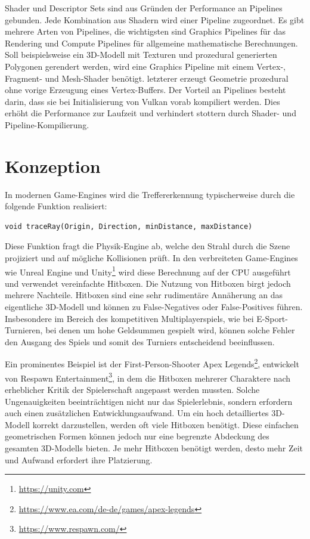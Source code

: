 \documentclass[11pt]{scrartcl}
\begin{document}
{	Shader und Descriptor Sets sind aus Gründen der Performance an Pipelines gebunden. Jede Kombination aus Shadern wird einer Pipeline zugeordnet. Es gibt mehrere Arten von Pipelines, die wichtigsten sind Graphics Pipelines für das Rendering und Compute Pipelines für allgemeine mathematische Berechnungen. Soll beispielsweise ein 3D-Modell mit Texturen und prozedural generierten Polygonen gerendert werden, wird eine Graphics Pipeline mit einem Vertex-, Fragment- und Mesh-Shader benötigt. letzterer erzeugt Geometrie prozedural ohne vorige Erzeugung eines Vertex-Buffers. Der Vorteil an Pipelines besteht darin, dass sie bei Initialisierung von Vulkan vorab kompiliert werden. Dies erhöht die Performance zur Laufzeit und verhindert stottern durch Shader- und Pipeline-Kompilierung.\cite{Sellers2017, VulkanPipelines}

	\pagebreak
	\section{Konzeption}
	
	In modernen Game-Engines wird die Treffererkennung typischerweise durch die folgende Funktion realisiert:
	\begin{lstlisting}[caption={\textit{traceRay} Funktion in Pseudocode},label={lst:listing-traceraypseudo}]
	void traceRay(Origin, Direction, minDistance, maxDistance)	\end{lstlisting}
	Diese Funktion fragt die Physik-Engine ab, welche den Strahl durch die Szene projiziert und auf mögliche Kollisionen prüft. In den verbreiteten Game-Engines wie Unreal Engine und Unity\footnote{\url{https://unity.com}} wird diese Berechnung auf der CPU ausgeführt und verwendet vereinfachte Hitboxen. Die Nutzung von Hitboxen birgt jedoch mehrere Nachteile. Hitboxen sind eine sehr rudimentäre Annäherung an das eigentliche 3D-Modell und können zu False-Negatives oder False-Positives führen. Insbesondere im Bereich des kompetitiven Multiplayerspiels, wie bei E-Sport-Turnieren, bei denen um hohe Geldsummen gespielt wird, können solche Fehler den Ausgang des Spiels und somit des Turniers entscheidend beeinflussen.
	
	Ein prominentes Beispiel ist der First-Person-Shooter Apex Legends\footnote{\url{https://www.ea.com/de-de/games/apex-legends}}, entwickelt von Respawn Entertainment\footnote{\url{https://www.respawn.com/}}, in dem die Hitboxen mehrerer Charaktere nach erheblicher Kritik der Spielerschaft angepasst werden mussten\cite{Sookie2019, Frechette2019}. Solche Ungenauigkeiten beeinträchtigen nicht nur das Spielerlebnis, sondern erfordern auch einen zusätzlichen Entwicklungsaufwand. Um ein hoch detailliertes 3D-Modell korrekt darzustellen, werden oft viele Hitboxen benötigt. Diese einfachen geometrischen Formen können jedoch nur eine begrenzte Abdeckung des gesamten 3D-Modells bieten. Je mehr Hitboxen benötigt werden, desto mehr Zeit und Aufwand erfordert ihre Platzierung.
	
}
\end{document}
